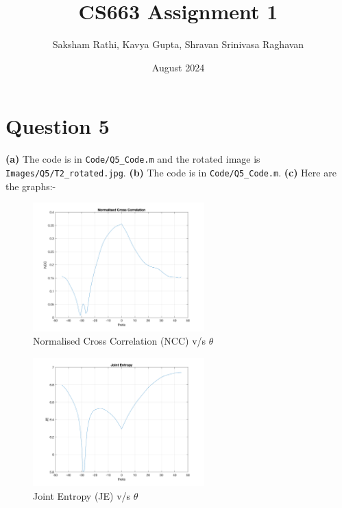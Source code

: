 \documentclass[12pt]{article}
\title{{\bf CS663 Assignment 1}}
\author{Saksham Rathi, Kavya Gupta, Shravan Srinivasa Raghavan}
\date{August 2024}
\begin{document}
\maketitle
\clearpage
\tableofcontents
\clearpage
\section*{Question 5}
    \vspace{-10pt}
    
    \textbf{(a)} The code is in \verb|Code/Q5_Code.m| and the rotated image is \verb|Images/Q5/T2_rotated.jpg|. \newline
    \textbf{(b)} The code is in \verb|Code/Q5_Code.m|. \newline
    \textbf{(c)} Here are the graphs:-
    
    \vspace{-13pt}
    
    \begin{figure}[H]
        \centering
        \includegraphics[width=0.59\textwidth]{../images/NCC.png}
        \vspace{-10pt}
        \caption{Normalised Cross Correlation (NCC) v/s $\theta$}
    \end{figure}
    
    \vspace{-25pt}
    
    \begin{figure}[H]
        \centering
        \includegraphics[width=0.59\textwidth]{../images/JE.png}
        \vspace{-10pt}
        \caption{Joint Entropy (JE) v/s $\theta$}
    \end{figure}
    
\end{document}
